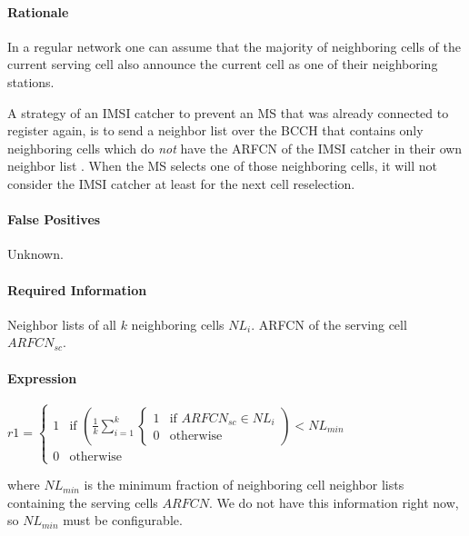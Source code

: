 \documentclass[a4paper,11pt,notitlepage,bigheadings,oneside]{scrartcl}
\begin{document}
\paragraph{Rationale}

In a regular network one can assume that the majority of neighboring cells of
the current serving cell also announce the current cell as one of their
neighboring stations. 

A strategy of an IMSI catcher to prevent an MS that was already connected to
register again, is to send a neighbor list over the BCCH that contains only
neighboring cells which do \emph{not} have the ARFCN of the IMSI catcher in
their own neighbor list \cite[0027]{bott2000verfahren}. When the MS selects one of
those neighboring cells, it will not consider the IMSI catcher at least for the
next cell reselection.

\paragraph{False Positives}

Unknown.

\paragraph{Required Information}

Neighbor lists of all $k$ neighboring cells $NL_i$. ARFCN of the serving cell
$ARFCN_{sc}$.

\paragraph{Expression}

$r1 =
\begin{cases}
	1 & \text{if } \left(\frac{1}{k}\displaystyle\sum_{i=1}^{k}
                                \begin{cases}
	                                1 & \text{if } ARFCN_{sc} \in NL_i \\
	                                0 & \text{otherwise}
                                \end{cases}\right) < NL_{min} \\
        0 & \text{otherwise}
        \end{cases}
$

where $NL_{min}$ is the minimum fraction of neighboring cell neighbor lists
containing the serving cells $ARFCN$. We do not have this information right
now, so $NL_{min}$ must be configurable.
\end{document}

